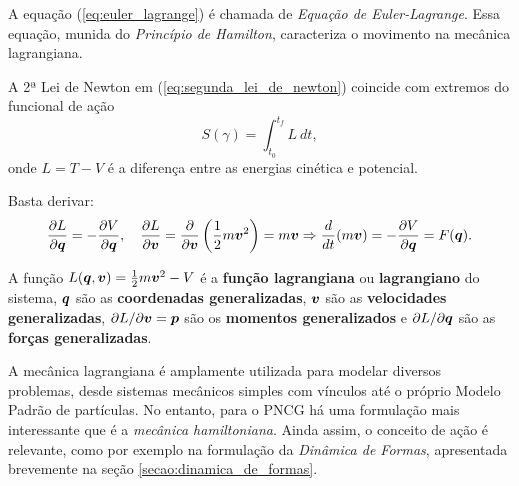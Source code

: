 A equação (\ref{eq:euler_lagrange}) é chamada de \textit{Equação de Euler-Lagrange}. Essa equação, munida do \textit{Princípio de Hamilton}, caracteriza o movimento na mecânica lagrangiana.

\begin{theorem}
    A 2ª Lei de Newton em (\ref{eq:segunda_lei_de_newton}) coincide com extremos do funcional de ação
    \begin{equation*}
        S(\gamma) = \int_{t_0}^{t_f} L \ dt,
    \end{equation*}
    onde $L = T - V$ é a diferença entre as energias cinética e potencial.
\end{theorem}
\begin{Proof}
    Basta derivar:
    \begin{equation*}
        \dfrac{\partial L}{\partial \bm q} = - \dfrac{\partial V}{\partial \bm q},
        \quad
        \dfrac{\partial L}{\partial \bm v} = \dfrac{\partial }{\partial \bm v}\left(\dfrac{1}{2} m \bm v^2 \right) = m \bm v
        \Rightarrow
        \dfrac{d }{d t}(m \bm v) = -\dfrac{\partial V}{\partial \bm q} = F(\bm q).
    \end{equation*}
\end{Proof}

\begin{definition}\label{def:generalizados}
    A função $L(\bm q, \bm v) = \frac{1}{2} m \bm v^2 - V$ é a \textbf{função lagrangiana} ou \textbf{lagrangiano} do sistema, $\bm q$ são as \textbf{coordenadas generalizadas}, $\bm v$ são as \textbf{velocidades generalizadas}, $\partial L / \partial \bm v = \bm p$ são os \textbf{momentos generalizados} e $\partial L / \partial \bm q$ são as \textbf{forças generalizadas}.
\end{definition}

A mecânica lagrangiana é amplamente utilizada para modelar diversos problemas, desde sistemas mecânicos simples com vínculos até o próprio Modelo Padrão de partículas. No entanto, para o PNCG há uma formulação mais interessante que é a \textit{mecânica hamiltoniana}. Ainda assim, o conceito de ação é relevante, como por exemplo na formulação da \textit{Dinâmica de Formas}, apresentada brevemente na seção \ref{secao:dinamica_de_formas}.